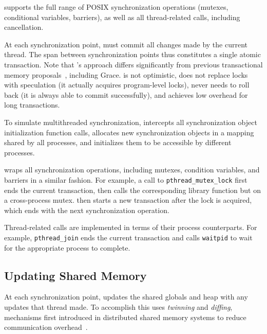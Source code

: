 \sheriff{} supports the full range of POSIX synchronization
operations (mutexes, conditional variables, barriers), as well as all
thread-related calls, including cancellation.

At each synchronization point, \sheriff{} must commit all changes made
by the current thread. The span between
synchronization points thus constitutes a single atomic
transaction. Note that \sheriff{}'s approach differs significantly
from previous transactional memory proposals~\cite{transaction},
including Grace. \sheriff{} is not optimistic, does not replace locks
with speculation (it actually acquires program-level locks), never
needs to roll back (it is always able to commit successfully), and
achieves low overhead for long transactions.

To simulate multithreaded synchronization, \sheriff{}
intercepts all synchronization object initialization function calls,
allocates new synchronization objects in a mapping shared
by all processes, and initializes them to be accessible by different
processes.

\sheriff{} wraps
all synchronization operations, including mutexes, condition
variables, and barriers in a similar fashion. For example, a call to
\texttt{pthread\_mutex\_lock} first ends the current transaction, 
then calls the corresponding \pthreads{} library function but on a
cross-process mutex. \sheriff{} then starts a new transaction after the
lock is acquired, which ends with the next synchronization operation.

Thread-related calls are implemented in terms of their process
counterparts. For example, \texttt{pthread\_join} ends the current
transaction and calls \texttt{waitpid} to wait for the appropriate
process to complete.


\subsection{Updating Shared Memory}

\label{sec:updatingsharedmemory}

At each synchronization point, \sheriff{} updates the shared
globals and heap with any updates that thread made.  To accomplish
this \sheriff{} uses \emph{twinning} and \emph{diffing}, mechanisms
first introduced in distributed shared memory systems to reduce
communication overhead~\cite{dsm:munin,dsm:treadmarks}.


